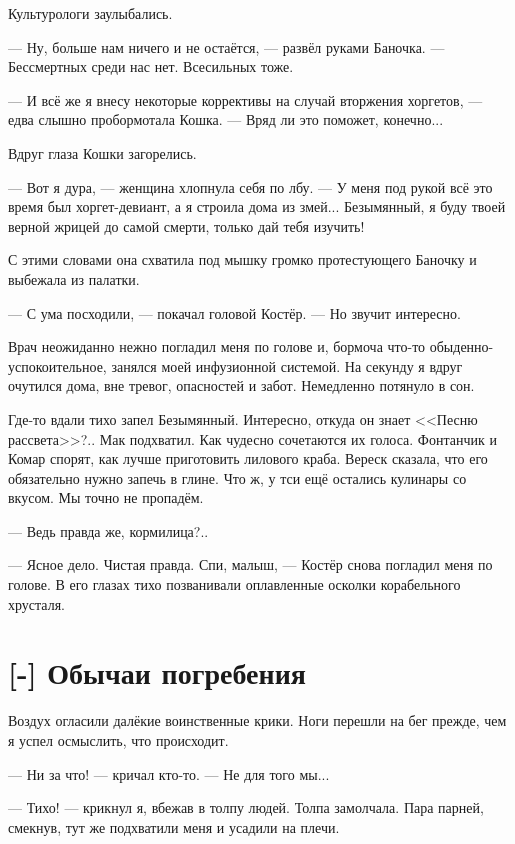 Культурологи заулыбались.

--- Ну, больше нам ничего и не остаётся, --- развёл руками Баночка.
--- Бессмертных среди нас нет.
Всесильных тоже.

--- И всё же я внесу некоторые коррективы на случай вторжения хоргетов, --- едва слышно пробормотала Кошка.
--- Вряд ли это поможет, конечно...

Вдруг глаза Кошки загорелись.

--- Вот я дура, --- женщина хлопнула себя по лбу.
--- У меня под рукой всё это время был хоргет-девиант, а я строила дома из змей\FM...
Безымянный, я буду твоей верной жрицей до самой смерти, только дай тебя изучить!

С этими словами она схватила под мышку громко протестующего Баночку и выбежала из палатки.

--- С ума посходили, --- покачал головой Костёр.
--- Но звучит интересно.

Врач неожиданно нежно погладил меня по голове и, бормоча что-то обыденно-успокоительное, занялся моей инфузионной системой.
На секунду я вдруг очутился дома, вне тревог, опасностей и забот.
Немедленно потянуло в сон.

Где-то вдали тихо запел Безымянный.
Интересно, откуда он знает <<Песню рассвета>>?..
Мак подхватил.
Как чудесно сочетаются их голоса.
Фонтанчик и Комар спорят, как лучше приготовить лилового краба.
Вереск сказала, что его обязательно нужно запечь в глине.
Что ж, у тси ещё остались кулинары со вкусом.
Мы точно не пропадём.

--- Ведь правда же, кормилица?..

--- Ясное дело.
Чистая правда.
Спи, малыш, --- Костёр снова погладил меня по голове.
В его глазах тихо позванивали оплавленные осколки корабельного хрусталя.

\section{[-] Обычаи погребения}

\textspace

Воздух огласили далёкие воинственные крики.
Ноги перешли на бег прежде, чем я успел осмыслить, что происходит.

--- Ни за что! --- кричал кто-то.
--- Не для того мы...

--- Тихо! --- крикнул я, вбежав в толпу людей.
Толпа замолчала.
Пара парней, смекнув, тут же подхватили меня и усадили на плечи.

